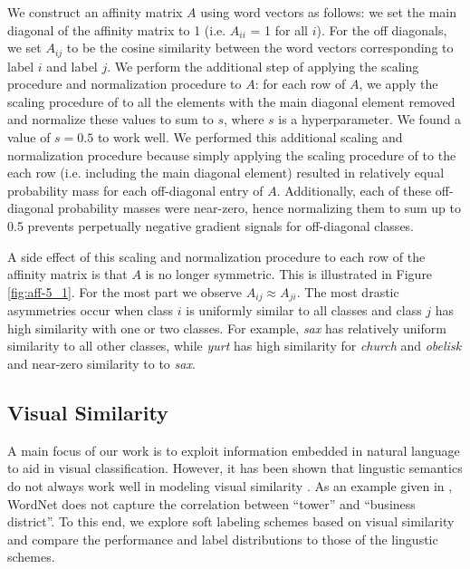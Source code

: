 We construct an affinity matrix $A$ using word vectors as follows: we set the
main diagonal of the affinity matrix to 1 (i.e. $A_{ii}$ = 1 for all $i$). For
the off diagonals, we set $A_{ij}$ to be the cosine similarity between the word
vectors corresponding to label $i$ and label $j$. We perform the additional step
of applying the scaling procedure and normalization procedure to $A$: for each
row of $A$, we apply the scaling procedure of \cite{zhao2011large} to all the
elements with the main diagonal element removed and normalize these values to
sum to $s$, where $s$ is a hyperparameter. We found a value of $s = 0.5$ to work
well.  We performed this additional scaling and normalization procedure because
simply applying the scaling procedure of \cite{zhao2011large} to the each row
(i.e.  including the main diagonal element) resulted in relatively equal
probability mass for each off-diagonal entry of $A$. Additionally, each of these
off-diagonal probability masses were near-zero, hence normalizing them to sum up
to 0.5 prevents perpetually negative gradient signals for off-diagonal classes.

A side effect of this scaling and normalization procedure to each row of the
affinity matrix is that $A$ is no longer symmetric. This is illustrated in
Figure \ref{fig:aff-5_1}. For the most part we observe $A_{ij} \approx A_{ji}$.
The most drastic asymmetries occur when class $i$ is uniformly similar to all
classes and class $j$ has high similarity with one or two classes. For example,
\emph{sax} has relatively uniform similarity to all other classes, while
\emph{yurt} has high similarity for \emph{church} and \emph{obelisk} and
near-zero similarity to to \emph{sax}.

\subsection{Visual Similarity}

A main focus of our work is to exploit information embedded in natural language
to aid in visual classification.  However, it has been shown that lingustic
semantics do not always work well in modeling visual similarity
\cite{li2010building}. As an example given in \cite{li2010building}, WordNet
does not capture the correlation between ``tower'' and ``business district''.
To this end, we explore soft labeling schemes based on visual similarity
and compare the performance and label distributions to those of the lingustic
schemes.


